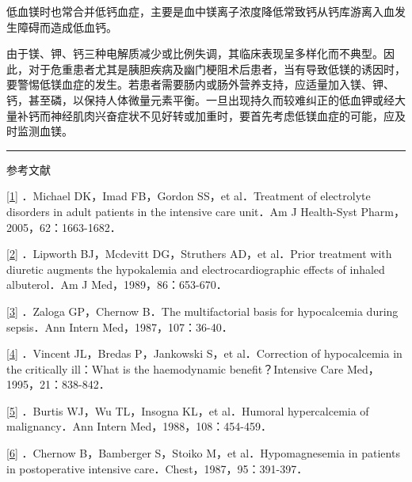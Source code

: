 低血镁时也常合并低钙血症，主要是血中镁离子浓度降低常致钙从钙库游离入血发生障碍而造成低血钙。

由于镁、钾、钙三种电解质减少或比例失调，其临床表现呈多样化而不典型。因此，对于危重患者尤其是胰胆疾病及幽门梗阻术后患者，当有导致低镁的诱因时，要警惕低镁血症的发生。若患者需要肠内或肠外营养支持，应适量加入镁、钾、钙，甚至磷，以保持人体微量元素平衡。一旦出现持久而较难纠正的低血钾或经大量补钙而神经肌肉兴奋症状不见好转或加重时，要首先考虑低镁血症的可能，应及时监测血镁。

\begin{center}\rule{0.5\linewidth}{\linethickness}\end{center}

参考文献

\protect\hyperlink{text00025.htmlux5cux23ch1-24-back}{{[}1{]}} ．Michael
DK，Imad FB，Gordon SS，et al．Treatment of electrolyte disorders in
adult patients in the intensive care unit．Am J Health-Syst
Pharm，2005，62：1663-1682．

\protect\hyperlink{text00025.htmlux5cux23ch2-24-back}{{[}2{]}}
．Lipworth BJ，Mcdevitt DG，Struthers AD，et al．Prior treatment with
diuretic augments the hypokalemia and electrocardiographic effects of
inhaled albuterol．Am J Med，1989，86：653-670．

\protect\hyperlink{text00025.htmlux5cux23ch3-24-back}{{[}3{]}} ．Zaloga
GP，Chernow B．The multifactorial basis for hypocalcemia during
sepsis．Ann Intern Med，1987，107：36-40．

\protect\hyperlink{text00025.htmlux5cux23ch4-24-back}{{[}4{]}} ．Vincent
JL，Bredas P，Jankowski S，et al．Correction of hypocalcemia in the
critically ill：What is the haemodynamic benefit？Intensive Care
Med，1995，21：838-842．

\protect\hyperlink{text00025.htmlux5cux23ch5-24-back}{{[}5{]}} ．Burtis
WJ，Wu TL，Insogna KL，et al．Humoral hypercalcemia of malignancy．Ann
Intern Med，1988，108：454-459．

\protect\hyperlink{text00025.htmlux5cux23ch6-24-back}{{[}6{]}} ．Chernow
B，Bamberger S，Stoiko M，et al．Hypomagnesemia in patients in
postoperative intensive care．Chest，1987，95：391-397．

\protect\hypertarget{text00026.html}{}{}


